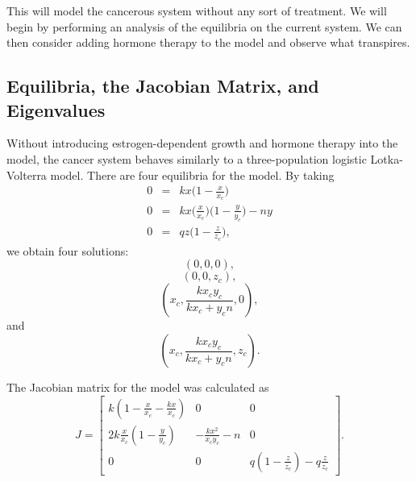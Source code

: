 \documentclass[12pt]{article}
\begin{document}
This will model the cancerous system without any sort of treatment.  We will begin by performing an analysis of the equilibria on the current system. We can then consider adding hormone therapy to the model and observe what transpires.



\subsection{Equilibria, the Jacobian Matrix, and Eigenvalues}
\indent\indent Without introducing estrogen-dependent growth and hormone therapy into the model, the cancer system behaves similarly to a three-population logistic Lotka-Volterra model.  There are four equilibria for the model. By taking 
\begin{eqnarray*}
    0 & = & kx\Big( 1-\frac{x}{x_c}\Big)\\
    0 & = & kx\Big( \frac{x}{x_c}\Big)\Big( 1-\frac{y}{y_c}\Big) - ny\\
    0 & = & qz\Big( 1-\frac{z}{z_c}\Big),
\end{eqnarray*}
\noindent
we obtain four solutions:
\begin{equation}
    \left( 0, 0, 0 \right),
\end{equation}
\begin{equation}
    \left( 0, 0, z_c \right),
\end{equation}
\begin{equation}
    \left( x_c, \frac{kx_cy_c}{kx_c+y_cn}, 0 \right),
\end{equation}
and
\begin{equation}
    \left( x_c, \frac{kx_cy_c}{kx_c+y_cn}, z_c \right). 
\end{equation}

\noindent The Jacobian matrix for the model was calculated as
\[J=
\begin{bmatrix}
k\left(1-\frac{x}{x_c}-\frac{kx}{x_c}\right) & 0 & 0 \\
2k\frac{x}{x_c}\left(1-\frac{y}{y_c}\right) & -\frac{kx^2}{x_cy_c}-n & 0 \\
0 & 0 & q\left(1-\frac{z}{z_c}\right)-q\frac{z}{z_c}
\end{bmatrix}.
\]
\end{document}
